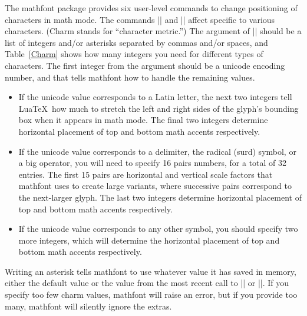 \documentclass[12pt,twoside]{article}
\begin{document}
The \textsf{mathfont} package provides six user-level commands to change positioning of characters in math mode. The commands |\CharmLine| and |\CharmFile| affect specific to various characters. (Charm stands for ``character metric.'') The argument of |\CharmLine| should be a list of integers and/or asterisks separated by commas and/or spaces, and Table~\ref{Charm} shows how many integers you need for different types of characters. The first integer from the argument should be a unicode encoding number, and that tells \textsf{mathfont} how to handle the remaining values.
\begin{itemize}
\item If the unicode value corresponds to a Latin letter, the next two integers tell Lua\TeX\ how much to stretch the left and right sides of the glyph's bounding box when it appears in math mode. The final two integers determine horizontal placement of top and bottom math accents respectively.
\item If the unicode value corresponds to a delimiter, the radical (surd) symbol, or a big operator, you will need to specify 16 pairs numbers, for a total of 32 entries. The first 15 pairs are horizontal and vertical scale factors that \textsf{mathfont} uses to create large variants, where successive pairs correspond to the next-larger glyph. The last two integers determine horizontal placement of top and bottom math accents respectively.
\item If the unicode value corresponds to any other symbol, you should specify two more integers, which will determine the horizontal placement of top and bottom math accents respectively.
\end{itemize}
Writing an asterisk tells \textsf{mathfont} to use whatever value it has saved in memory, either the default value or the value from the most recent call to |\CharmLine| or |\CharmFile|. If you specify too few charm values, \textsf{mathfont} will raise an error, but if you provide too many, \textsf{mathfont} will silently ignore the extras.
\end{document}
